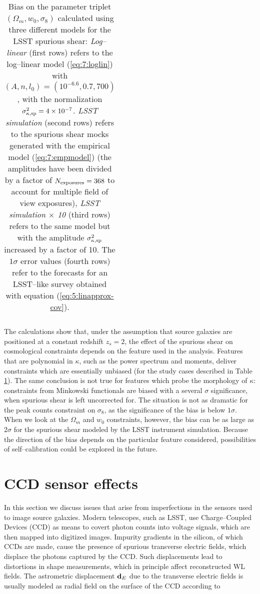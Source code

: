 \begin{table}
\begin{center}
\begin{tabular}{c|ccc}
\end{tabular}
\end{center}

\caption{Bias on the parameter triplet $(\Omega_m,w_0,\sigma_8)$ calculated using three different models for the LSST spurious shear: \textit{Log--linear} (first rows) refers to the log--linear model (\ref{eq:7:loglin}) with $(A,n,l_0)=(10^{-6.6},0.7,700)$, with the normalization $\sigma^2_{\kappa,{\rm sp}}=4\times10^{-7}$. \textit{LSST simulation} (second rows) refers to the spurious shear mocks generated with the empirical model (\ref{eq:7:empmodel}) (the amplitudes have been divided by a factor of $N_{\rm exposures}=368$ to account for multiple field of view exposures), \textit{LSST simulation $\times$ 10} (third rows) refers to the same model but with the amplitude $\sigma^2_{\kappa,{\rm sp}}$ increased by a factor of 10. The $1\sigma$ error values (fourth rows) refer to the forecasts for an LSST--like survey obtained with equation (\ref{eq:5:linapprox-cov}).}
\label{tab:7:spbias}
\end{table}
%
The calculations show that, under the assumption that source galaxies are positioned at a constant redshift $z_s=2$, the effect of the spurious shear on cosmological constraints depends on the feature used in the analysis. Features that are polynomial in $\kappa$, such as the power spectrum and moments, deliver constraints which are essentially unbiased (for the study cases described in Table \ref{tab:7:spbias}). The same conclusion is not true for features which probe the morphology of $\kappa$: constraints from Minkowski functionals are biased with a several $\sigma$ significance, when spurious shear is left uncorrected for. The situation is not as dramatic for the peak counts constraint on $\sigma_8$, as the significance of the bias is below $1\sigma$. When we look at the $\Omega_m$ and $w_0$ constraints, however, the bias can be as large as $2\sigma$ for the spurious shear modeled by the LSST instrument simulation. Because the direction of the bias depends on the particular feature considered, possibilities of self--calibration could be explored in the future.

\section{CCD sensor effects}
\label{sec:7:ccd}
In this section we discuss issues that arise from imperfections in the sensors used to image source galaxies. Modern telescopes, such as LSST, use Charge--Coupled Devices (CCD) \citep{CCDBook,LSST,LSSTOperations} as means to covert photon counts into voltage signals, which are then mapped into digitized images. Impurity gradients in the silicon, of which CCDs are made, cause the presence of spurious transverse electric fields, which displace the photons captured by the CCD. Such displacements lead to distortions in shape measurements, which in principle affect reconstructed WL fields. The astrometric displacement $\mathbf{d}_E$ due to the transverse electric fields is usually modeled as radial field \citep{PetriCCD} on the surface of the CCD according to

